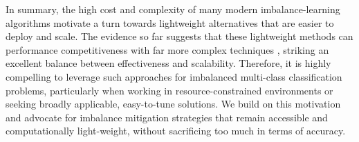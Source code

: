In summary, the high cost and complexity of many modern imbalance-learning algorithms motivate a turn towards lightweight alternatives that are easier to deploy and scale. 
The evidence so far suggests that these lightweight methods can performance competitiveness with far more complex techniques \cite{Chen2024,Ghosh2024}, striking an excellent balance between effectiveness and scalability. Therefore, it is highly compelling to leverage such approaches for imbalanced multi-class classification problems, particularly when working in resource-constrained environments or seeking broadly applicable, easy-to-tune solutions. We build on this motivation and advocate for imbalance mitigation strategies that remain accessible and computationally light-weight, without sacrificing too much in terms of accuracy.
